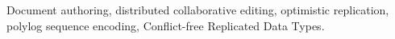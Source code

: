 
\begin{keyword}
Document authoring, distributed collaborative editing, optimistic replication,
polylog sequence encoding, Conflict-free Replicated Data Types.
\end{keyword}

